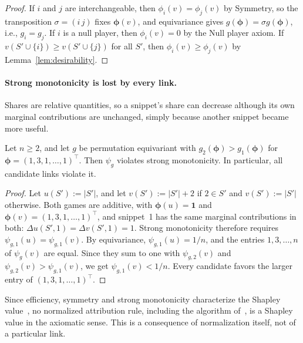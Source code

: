 \begin{proof}
If $i$ and $j$ are interchangeable, then $\phi_i(v) = \phi_j(v)$ by Symmetry, so the transposition $\sigma = (i\,j)$ fixes $\boldsymbol{\phi}(v)$, and equivariance gives $g(\boldsymbol{\phi}) = \sigma g(\boldsymbol{\phi})$, i.e., $g_i = g_j$. If $i$ is a null player, then $\phi_i(v) = 0$ by the Null player axiom. If $v(S' \cup \{i\}) \ge v(S' \cup \{j\})$ for all $S'$, then $\phi_i(v) \ge \phi_j(v)$ by Lemma~\ref{lem:desirability}.
\end{proof}

\paragraph{Strong monotonicity is lost by every link.}
Shares are relative quantities, so a snippet's share can decrease although its own marginal contributions are unchanged, simply because another snippet became more useful.

\begin{proposition}\label{prop:no_strong_monotonicity}
Let $n \ge 2$, and let $g$ be permutation equivariant with $g_2(\boldsymbol{\phi}) > g_1(\boldsymbol{\phi})$ for $\boldsymbol{\phi} = (1, 3, 1, \dots, 1)^\top$. Then $\psi_g$ violates strong monotonicity. In particular, all candidate links violate it.
\end{proposition}

\begin{proof}
Let $u(S') := |S'|$, and let $v(S') := |S'| + 2$ if $2 \in S'$ and $v(S') := |S'|$ otherwise. Both games are additive, with $\boldsymbol{\phi}(u) = \mathbf{1}$ and $\boldsymbol{\phi}(v) = (1, 3, 1, \dots, 1)^\top$, and snippet~1 has the same marginal contributions in both: $\Delta u(S', 1) = \Delta v(S', 1) = 1$. Strong monotonicity therefore requires $\psi_{g,1}(u) = \psi_{g,1}(v)$. By equivariance, $\psi_{g,1}(u) = 1/n$, and the entries $1, 3, \dots, n$ of $\psi_g(v)$ are equal. Since they sum to one with $\psi_{g,2}(v)$ and $\psi_{g,2}(v) > \psi_{g,1}(v)$, we get $\psi_{g,1}(v) < 1/n$. Every candidate favors the larger entry of $(1, 3, 1, \dots, 1)^\top$.
\end{proof}

Since efficiency, symmetry and strong monotonicity characterize the Shapley value~\cite{young1985monotonic}, no normalized attribution rule, including the algorithm of~\cite{nematov2025source}, is a Shapley value in the axiomatic sense. This is a consequence of normalization itself, not of a particular link.


